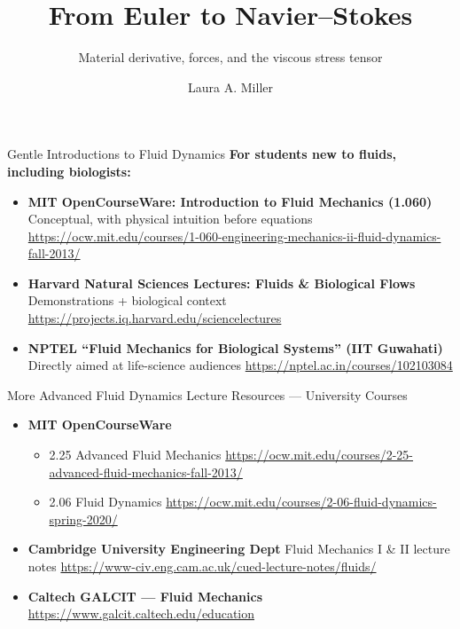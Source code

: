 \documentclass[aspectratio=169]{beamer}
\title{From Euler to Navier--Stokes}
\subtitle{Material derivative, forces, and the viscous stress tensor}
\author{Laura A. Miller}
\institute{University of Arizona}
\date{}
\begin{document}
\begin{frame}
  \titlepage
\end{frame}


\begin{frame}{Gentle Introductions to Fluid Dynamics}
\textbf{For students new to fluids, including biologists:}
\tiny
\begin{itemize}
  \item \textbf{MIT OpenCourseWare: Introduction to Fluid Mechanics (1.060)}  
  Conceptual, with physical intuition before equations  
  \url{https://ocw.mit.edu/courses/1-060-engineering-mechanics-ii-fluid-dynamics-fall-2013/}

  \item \textbf{Harvard Natural Sciences Lectures: Fluids \& Biological Flows}  
  Demonstrations + biological context  
  \url{https://projects.iq.harvard.edu/sciencelectures}

  \item \textbf{NPTEL “Fluid Mechanics for Biological Systems” (IIT Guwahati)}  
  Directly aimed at life-science audiences  
  \url{https://nptel.ac.in/courses/102103084}
\end{itemize}

\end{frame}

\begin{frame}{More Advanced Fluid Dynamics Lecture Resources — University Courses}
\begin{itemize}
  \item \textbf{MIT OpenCourseWare}
  \begin{itemize}
    \item 2.25 Advanced Fluid Mechanics  
    \url{https://ocw.mit.edu/courses/2-25-advanced-fluid-mechanics-fall-2013/}
    \item 2.06 Fluid Dynamics  
    \url{https://ocw.mit.edu/courses/2-06-fluid-dynamics-spring-2020/}
  \end{itemize}

  \item \textbf{Cambridge University Engineering Dept}  
  Fluid Mechanics I \& II lecture notes  
  \url{https://www-civ.eng.cam.ac.uk/cued-lecture-notes/fluids/}

  \item \textbf{Caltech GALCIT — Fluid Mechanics}  
  \url{https://www.galcit.caltech.edu/education}
\end{itemize}

\end{frame}
\end{document}
